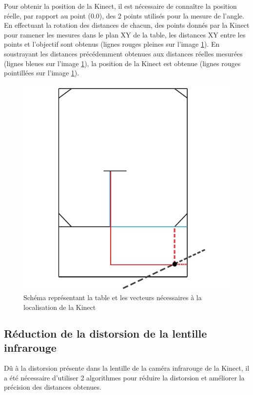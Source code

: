 Pour obtenir la position de la Kinect, il est nécessaire de connaître la position réelle, par rapport au point (0.0), des 2 points utilisés pour la mesure de l'angle. En effectuant la rotation des distances de chacun, des points donnés par la Kinect pour ramener les mesures dans le plan XY de la table, les distances XY entre les points et l'objectif sont obtenus (lignes rouges pleines sur l'image \ref{fig:kinect_position}). En soustrayant les distances précédemment obtenues aux distances réelles mesurées (lignes bleues sur l'image \ref{fig:kinect_position}), la position de la Kinect est obtenue (lignes rouges pointillées sur l'image \ref{fig:kinect_position}).

\begin{figure}[htbp]
\centering
\includegraphics[scale=1]{fig/kinect_position.pdf}
\caption{Schéma représentant la table et les vecteurs nécessaires à la localisation de la Kinect}
\label{fig:kinect_position}
\end{figure}

\subsection {Réduction de la distorsion de la lentille infrarouge}
Dû à la distorsion présente dans la lentille de la caméra infrarouge de la Kinect, il a été nécessaire d'utiliser 2 algorithmes pour réduire la distorsion et améliorer la précision des distances obtenues.

